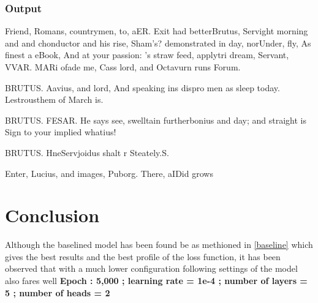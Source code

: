 \documentclass[conference]{IEEEtran}
\begin{document}
\subsubsection{Output}

Friend, Romans, countrymen, to, aER.
Exit had betterBrutus, Servight morning and and chonductor and his rise,
Sham’s? demonstrated in day, norUnder, fly,
As finest a eBook,
And at your passion:
’s straw feed, applytri dream, Servant,
VVAR.
MARi ofade me,
Cass lord, and Octavurn runs Forum.

BRUTUS.
Aavius, and lord,
And speaking ins dispro men as sleep today.
Lestrousthem of March is.


BRUTUS.
FESAR.
He says see, swelltain furtherbonius and day; and straight is
Sign to your implied
whatius!

BRUTUS.
HneServjoidus shalt r Steately.S.



Enter, Lucius, and images, Puborg.
There, aIDid grows

\section{Conclusion}
Although the baselined model has been found be as methioned in \ref{baseline} which gives the best results and the best profile of the loss function, it has been observed that with a much lower configuration following settings of the model also fares well 
\textbf{Epoch : 5,000 ; learning rate = 1e-4 ; number of layers = 5 ; number of heads = 2}
\end{document}

